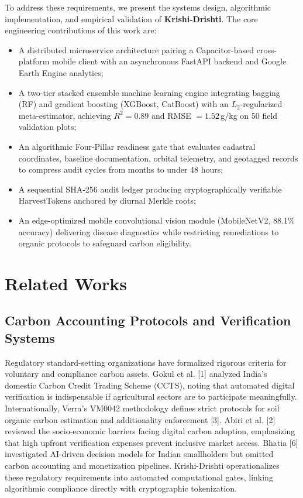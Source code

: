 \documentclass[10pt,a4paper,twocolumn]{IEEEtran}
\begin{document}
To address these requirements, we present the systems design, algorithmic implementation, and empirical validation of \textbf{Krishi-Drishti}. The core engineering contributions of this work are:
\begin{itemize}
  \item A distributed microservice architecture pairing a Capacitor-based cross-platform mobile client with an asynchronous FastAPI backend and Google Earth Engine analytics;
  \item A two-tier stacked ensemble machine learning engine integrating bagging (RF) and gradient boosting (XGBoost, CatBoost) with an $L_2$-regularized meta-estimator, achieving $R^2 = 0.89$ and RMSE $= 1.52\,$g/kg on 50 field validation plots;
  \item An algorithmic Four-Pillar readiness gate that evaluates cadastral coordinates, baseline documentation, orbital telemetry, and geotagged records to compress audit cycles from months to under 48 hours;
  \item A sequential SHA-256 audit ledger producing cryptographically verifiable HarvestTokens anchored by diurnal Merkle roots;
  \item An edge-optimized mobile convolutional vision module (MobileNetV2, 88.1\% accuracy) delivering disease diagnostics while restricting remediations to organic protocols to safeguard carbon eligibility.
\end{itemize}

\section{Related Works}

\subsection{Carbon Accounting Protocols and Verification Systems}
Regulatory standard-setting organizations have formalized rigorous criteria for voluntary and compliance carbon assets. Gokul et al. [1] analyzed India's domestic Carbon Credit Trading Scheme (CCTS), noting that automated digital verification is indispensable if agricultural sectors are to participate meaningfully. Internationally, Verra's VM0042 methodology defines strict protocols for soil organic carbon estimation and additionality enforcement [3]. Abiri et al. [2] reviewed the socio-economic barriers facing digital carbon adoption, emphasizing that high upfront verification expenses prevent inclusive market access. Bhatia [6] investigated AI-driven decision models for Indian smallholders but omitted carbon accounting and monetization pipelines. Krishi-Drishti operationalizes these regulatory requirements into automated computational gates, linking algorithmic compliance directly with cryptographic tokenization.
\end{document}
